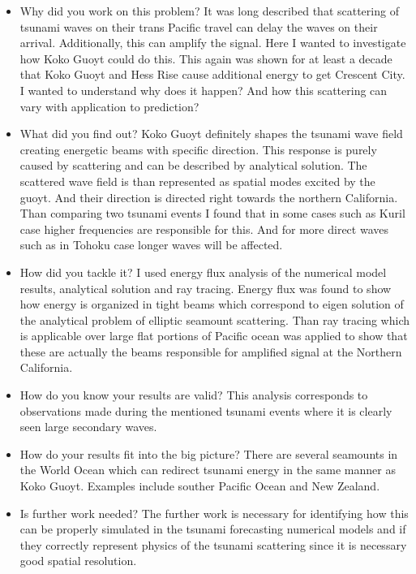 \begin{itemize}
\item Why did you work on this problem?
It was long described that scattering of tsunami waves on their trans Pacific travel can delay the waves on their arrival. Additionally, this can amplify the signal. Here I wanted to investigate how Koko Guoyt could do this. This again was shown for at least a decade that Koko Guoyt and Hess Rise cause additional energy to get Crescent City. I wanted to understand why does it happen? And how this scattering can vary with application to prediction?

\item What did you find out?
Koko Guoyt definitely shapes the tsunami wave field creating energetic beams with specific direction. This response is purely caused by scattering and can be described by analytical solution. The scattered wave field is than represented as spatial modes excited by the guoyt. And their direction is directed right towards the northern California. Than comparing two tsunami events I found that in some cases such as Kuril case higher frequencies are responsible for this. And for more direct waves such as in Tohoku case longer waves will be affected.

\item How did you tackle it?
I used energy flux analysis of the numerical model results, analytical solution and ray tracing. Energy flux was found to show how energy is organized in tight beams which correspond to eigen solution of the analytical problem of elliptic seamount scattering. Than ray tracing which is applicable over large flat portions of Pacific ocean was applied to show that these are actually the beams responsible for amplified signal at the Northern California.

\item How do you know your results are valid?
This analysis corresponds to observations made during the mentioned tsunami events where it is clearly seen large secondary waves.

\item How do your results fit into the big picture?
There are several seamounts in the World Ocean which can redirect tsunami energy in the same manner as Koko Guoyt. Examples include souther Pacific Ocean and New Zealand.

\item Is further work needed?
The further work is necessary for identifying how this can be properly simulated in the tsunami forecasting numerical models and if they correctly represent physics of the tsunami scattering since it is necessary good spatial resolution.
\end{itemize}

